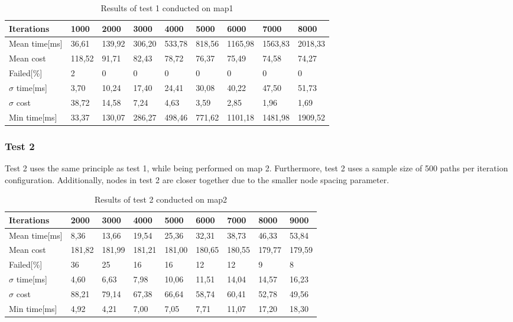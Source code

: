 \begin{table}[!ht]
	\centering
	\renewcommand{\arraystretch}{1.2}
	\begin{tabular}{|l||l|l|l|l|l|l|l|l|}
		\hline
		Iterations & 1000 & 2000 & 3000 & 4000 & 5000 & 6000 & 7000 & 8000 \\ \hline\hline
		Mean time[ms] & 36,61  & 139,92  & 306,20  & 533,78  & 818,56  & 1165,98  & 1563,83  & 2018,33  \\ \hline
		Mean cost & 118,52  & 91,71  & 82,43  & 78,72  & 76,37  & 75,49  & 74,58  & 74,27  \\ \hline
		Failed[\%] & 2  & 0  & 0  & 0  & 0  & 0  & 0  & 0  \\ \hline
		$\sigma$ time[ms] & 3,70  & 10,24  & 17,40  & 24,41  & 30,08  & 40,22  & 47,50  & 51,73  \\ \hline
		$\sigma$ cost & 38,72  & 14,58  & 7,24  & 4,63  & 3,59  & 2,85  & 1,96  & 1,69  \\ \hline
		Min time[ms] & 33,37  & 130,07  & 286,27  & 498,46  & 771,62  & 1101,18  & 1481,98  & 1909,52  \\ \hline
	\end{tabular}
	\label{tab:pp_precision1}
	\caption{Results of test 1 conducted on map1}
\end{table}

\subsubsection{Test 2}
\label{sec:test2}
Test 2 uses the same principle as test 1, while being performed on map 2. Furthermore, test 2 uses a sample size of 500 paths per iteration configuration. Additionally, nodes in test 2 are closer together due to the smaller node spacing parameter. 

\begin{table}[!ht]
	\centering
	\renewcommand{\arraystretch}{1.2}
	\begin{tabular}{|l||l|l|l|l|l|l|l|l|}
		\hline
		Iterations & 2000 & 3000 & 4000 & 5000 & 6000 & 7000 & 8000 & 9000 \\ \hline\hline
		Mean time[ms] & 8,36  & 13,66  & 19,54  & 25,36  & 32,31  & 38,73  & 46,33  & 53,84  \\ \hline
		Mean cost & 181,82  & 181,99  & 181,21  & 181,00  & 180,65  & 180,55  & 179,77  & 179,59  \\ \hline
		Failed[\%] & 36  & 25  & 16  & 16  & 12  & 12  & 9  & 8  \\ \hline
		$\sigma$ time[ms] & 4,60  & 6,63  & 7,98  & 10,06  & 11,51  & 14,04  & 14,57  & 16,23  \\ \hline
		$\sigma$ cost & 88,21  & 79,14  & 67,38  & 66,64  & 58,74  & 60,41  & 52,78  & 49,56  \\ \hline
		Min time[ms] & 4,92  & 4,21  & 7,00  & 7,05  & 7,71  & 11,07  & 17,20  & 18,30  \\ \hline
	\end{tabular}
	\label{tab:pp_precision2}
	\caption{Results of test 2 conducted on map2}
\end{table}

